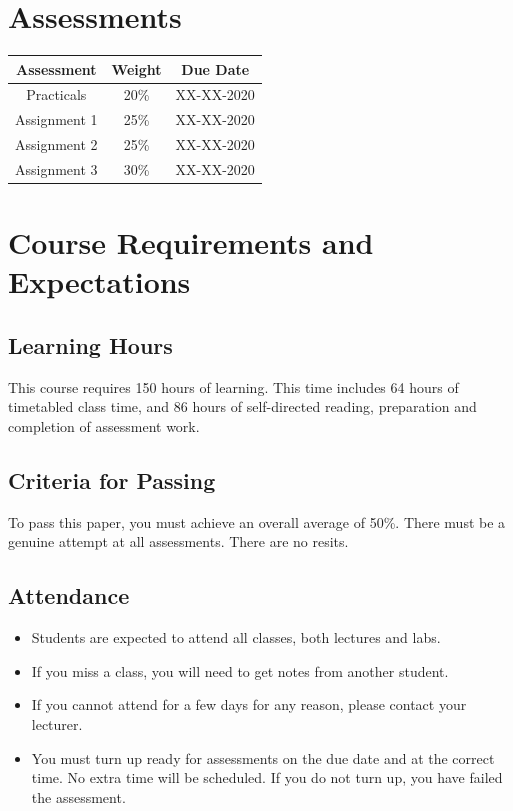 \documentclass{article}
\begin{document}
\section*{Assessments}
\renewcommand{\arraystretch}{1.5}
\begin{tabular}{|c|c|c|}
  \hline
  \textbf{Assessment} & \textbf{Weight} & \textbf{Due Date} \\ \hline
  Practicals          & 20\%            & XX-XX-2020        \\ \hline
  Assignment 1        & 25\%            & XX-XX-2020        \\ \hline
  Assignment 2        & 25\%            & XX-XX-2020        \\ \hline
  Assignment 3        & 30\%            & XX-XX-2020        \\ \hline
\end{tabular}

\section*{Course Requirements and Expectations}

\subsection*{Learning Hours}
This course requires 150 hours of learning. This time includes 64 hours of timetabled class time, and 86 hours of self-directed reading, preparation and completion of assessment work.

\subsection*{Criteria for Passing}
To pass this paper, you must achieve an overall average of 50\%. There must be a genuine attempt at all assessments. There are no resits.

\subsection*{Attendance}
\begin{itemize}
  \item Students are expected to attend all classes, both lectures and labs.
  \item If you miss a class, you will need to get notes from another student.
  \item If you cannot attend for a few days for any reason, please contact your lecturer.
  \item You must turn up ready for assessments on the due date and at the correct time. No extra time will be scheduled. If you do not turn up, you have failed the assessment.
\end{itemize}
\end{document}
